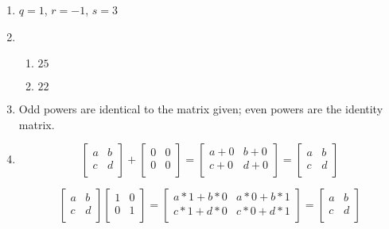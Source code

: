 \documentclass[11pt]{article}
\begin{document}
\begin{enumerate}
\item $q=1$, $r=-1$, $s=3$


\item 
\begin{enumerate}
\item $25$
\item $22$
\end{enumerate}




\item Odd powers are identical to the matrix given; even powers are the identity matrix.


\item 
\[
\left[\begin{array}{cc}
a & b \\
c & d \\
\end{array}\right]
+
\left[\begin{array}{cc}
0 & 0 \\
0 & 0 \\
\end{array}\right]
=
\left[\begin{array}{cc}
a+0 & b+0 \\
c+0 & d+0 \\
\end{array}\right]
=
\left[\begin{array}{cc}
a & b \\
c & d \\
\end{array}\right]
\]

\[
\left[\begin{array}{cc}
a & b \\
c & d \\
\end{array}\right]
\left[\begin{array}{cc}
1 & 0 \\
0 & 1 \\
\end{array}\right]
=
\left[\begin{array}{cc}
a*1 + b*0 & a*0 + b*1 \\
c*1 + d*0 & c*0 + d*1 \\
\end{array}\right]
=
\left[\begin{array}{cc}
a & b \\
c & d \\
\end{array}\right]
\]



\end{enumerate}
\end{document}

